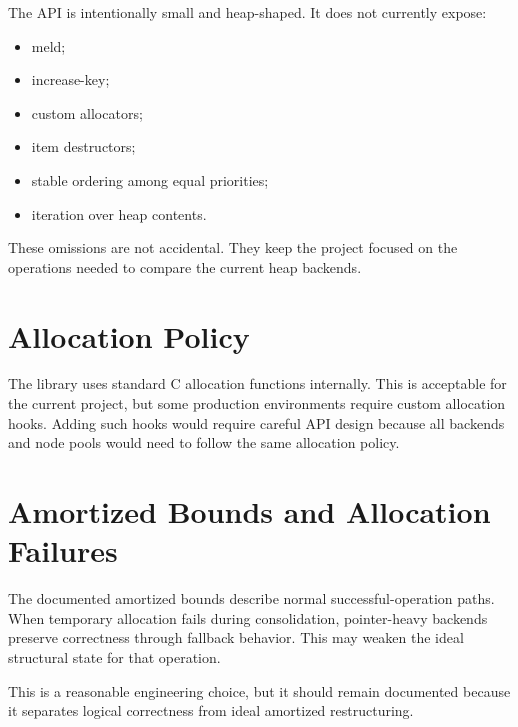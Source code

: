 The API is intentionally small and heap-shaped.
It does not currently expose:

\begin{itemize}
    \item meld;
    \item increase-key;
    \item custom allocators;
    \item item destructors;
    \item stable ordering among equal priorities;
    \item iteration over heap contents.
\end{itemize}

These omissions are not accidental.
They keep the project focused on the operations needed to compare the current heap backends.

\section{Allocation Policy}

The library uses standard C allocation functions internally.
This is acceptable for the current project, but some production environments require custom allocation hooks.
Adding such hooks would require careful API design because all backends and node pools would need to follow the same allocation policy.

\section{Amortized Bounds and Allocation Failures}

The documented amortized bounds describe normal successful-operation paths.
When temporary allocation fails during consolidation, pointer-heavy backends preserve correctness through fallback behavior.
This may weaken the ideal structural state for that operation.

This is a reasonable engineering choice, but it should remain documented because it separates logical correctness from ideal amortized restructuring.
